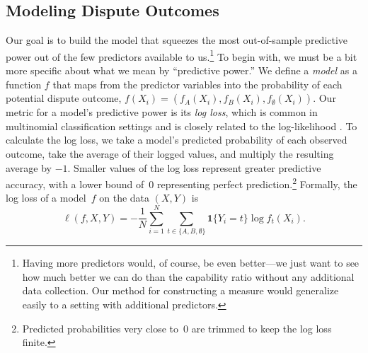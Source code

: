 \subsection{Modeling Dispute Outcomes}

Our goal is to build the model that squeezes the most out-of-sample predictive power out of the few predictors available to us.\footnote{
  Having more predictors would, of course, be even better---we just want to see how much better we can do than the capability ratio without any additional data collection.
  Our method for constructing a measure would generalize easily to a setting with additional predictors.
}
To begin with, we must be a bit more specific about what we mean by ``predictive power.''
We define a \emph{model} as a function $f$ that maps from the predictor variables into the probability of each potential dispute outcome, $f(X_i) = (f_A(X_i), f_B(X_i), f_{\emptyset}(X_i))$.
Our metric for a model's predictive power is its \emph{log loss}, which is common in multinomial classification settings and is closely related to the log-likelihood \citep[221]{Hastie:2009wpa}.
To calculate the log loss, we take a model's predicted probability of each observed outcome, take the average of their logged values, and multiply the resulting average by $-1$.
Smaller values of the log loss represent greater predictive accuracy, with a lower bound of~$0$ representing perfect prediction.\footnote{
  Predicted probabilities very close to~0 are trimmed to keep the log loss finite.
}
Formally, the log loss of a model~$f$ on the data $(X, Y)$ is
\begin{equation}
  \label{eq:log-loss}
  \ell(f, X, Y)
  =
  - \frac{1}{N} \sum_{i = 1}^{N} \sum_{t \in \{A, B, \emptyset\}}
  \mathbf{1} \{Y_i = t\} \log f_t(X_i).
\end{equation}

